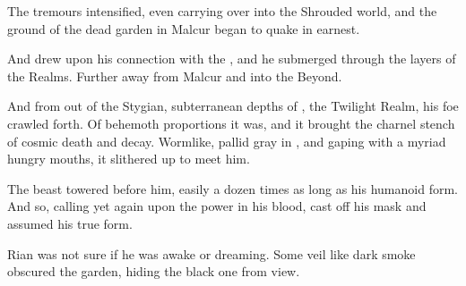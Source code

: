 
The tremours intensified, even carrying over into the Shrouded world, and the ground of the dead garden in Malcur began to quake in earnest. 


And \Ishnaruchaefir{} drew upon his connection with the \xzaishanns{}, and he submerged through the layers of the Realms. Further away from Malcur and into the Beyond. 

\index{\Nyx}
And from out of the Stygian, subterranean depths of \Nyx, the Twilight Realm, his foe crawled forth. 
Of behemoth proportions it was, and it brought the charnel stench of cosmic death and decay. 
Wormlike, pallid gray in \colour, and gaping with a myriad hungry mouths, it slithered up to meet him. 

\index{\ghobal}

The beast towered before him, easily a dozen times as long as his humanoid form. 
And so, calling yet again upon the \xzaishannic{} power in his blood, \Ishnaruchaefir{} cast off his mask and assumed his true form. 









\begin{comment}
\subsection{Battle beyond the Shroud}
\end{comment}

\begin{comment}
\subsubsection{Rian}
\end{comment}
\new
Rian was not sure if he was awake or dreaming. 
Some veil like dark smoke obscured the garden, hiding the black one from view. %

